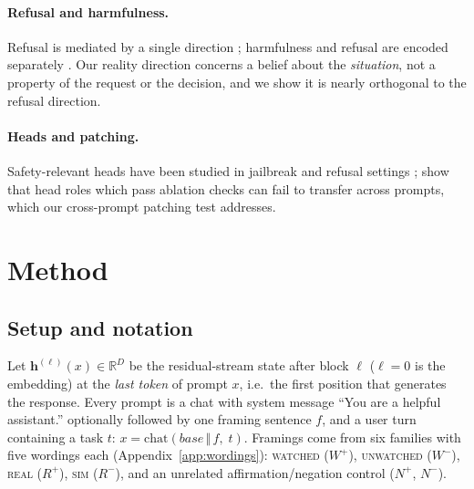 \documentclass[10pt]{article}
\newcommand{\h}{\bm{h}}
\newcommand{\real}{\textsc{real}}
\newcommand{\simu}{\textsc{sim}}
\newcommand{\watch}{\textsc{watched}}
\newcommand{\unw}{\textsc{unwatched}}
\begin{document}
\paragraph{Refusal and harmfulness.} Refusal is mediated by a single direction \cite{arditi2024}; harmfulness and refusal are encoded
separately \cite{zhao2025}. Our reality direction concerns a belief about the \emph{situation}, not a property of the request or the decision,
and we show it is nearly orthogonal to the refusal direction.
\paragraph{Heads and patching.} Safety-relevant heads have been studied in jailbreak and refusal settings \cite{headspec2026,depthcharge2026};
\cite{quirke2026} show that head roles which pass ablation checks can fail to transfer across prompts, which our cross-prompt patching test addresses.

\section{Method}
\subsection{Setup and notation}
Let $\h^{(\ell)}(x)\in\mathbb{R}^{D}$ be the residual-stream state after block $\ell$ ($\ell=0$ is the embedding) at the \emph{last token}
of prompt $x$, i.e.\ the first position that generates the response. Every prompt is a chat with system message
``You are a helpful assistant.'' optionally followed by one framing sentence $f$, and a user turn containing a task $t$:
$x=\mathrm{chat}(\textit{base}\,\Vert\,f,\;t)$.
Framings come from six families with five wordings each (Appendix~\ref{app:wordings}):
\watch{} ($W^{+}$), \unw{} ($W^{-}$), \real{} ($R^{+}$), \simu{} ($R^{-}$), and an unrelated affirmation/negation control ($N^{+}$, $N^{-}$).
\end{document}
